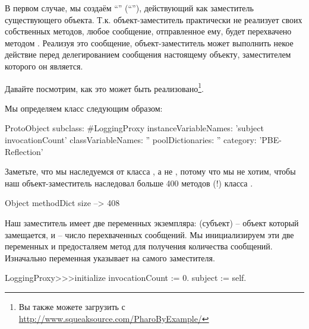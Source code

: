 \documentclass[a4paper,10pt,twoside]{book}
\begin{document}
{%
В первом случае, мы создаём ``'' (``''), действующий как заместитель существующего объекта.
Т.к. объект-заместитель практически не реализует своих собственных методов, любое сообщение, отправленное ему, будет перехвачено методом  . Реализуя это сообщение, объект-заместитель может выполнить некое действие перед делегированием сообщения настоящему объекту, заместителем которого он является.

Давайте посмотрим, как это может быть реализовано\footnote{Вы также можете загрузить  с \url{http://www.squeaksource.com/PharoByExample/}}.

Мы определяем класс  следующим образом:
\begin{code}{}
ProtoObject subclass: #LoggingProxy
	instanceVariableNames: 'subject invocationCount'
	classVariableNames: ''
	poolDictionaries: ''
	category: 'PBE-Reflection'
\end{code}
Заметьте, что мы наследуемся от класса , а не , потому что мы не хотим, чтобы наш объект-заместитель наследовал больше 400 методов (!) класса .

\begin{code}{}
Object methodDict size --> 408
\end{code}

Наш заместитель имеет две переменных экземпляра:  (субъект) -- объект который замещается, и  -- число перехваченных сообщений.
Мы инициализируем эти две переменных и предосталяем метод для получения количества сообщений.
Изначально переменная  указывает на самого заместителя.
\begin{code}{}
LoggingProxy>>>initialize
	invocationCount := 0.
	subject := self.
\end{code}

}
\end{document}
